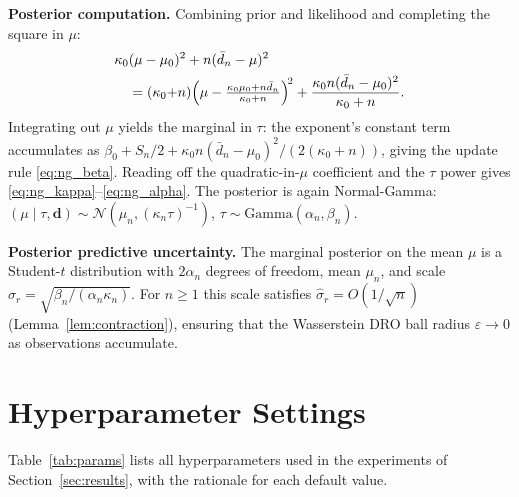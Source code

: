 \documentclass[opre,dblanonrev]{informs4}
\begin{document}
\begin{APPENDICES}
\textbf{Posterior computation.}
Combining prior and likelihood and completing the square in $\mu$:
\begin{align*}
&\kappa_0(\mu-\mu_0)^2 + n(\bar{d}_n - \mu)^2 \\
&\quad= (\kappa_0{+}n)\Bigl(\mu - \tfrac{\kappa_0\mu_0+n\bar{d}_n}{\kappa_0+n}\Bigr)^{\!2}
  + \frac{\kappa_0 n(\bar{d}_n-\mu_0)^2}{\kappa_0+n}.
\end{align*}
Integrating out $\mu$ yields the marginal in $\tau$:
the exponent's constant term accumulates as
$\beta_0 + S_n/2 + \kappa_0 n(\bar{d}_n-\mu_0)^2/(2(\kappa_0+n))$,
giving the update rule \eqref{eq:ng_beta}.
Reading off the quadratic-in-$\mu$ coefficient and the $\tau$ power
gives \eqref{eq:ng_kappa}--\eqref{eq:ng_alpha}.
The posterior is again Normal-Gamma:
$(\mu\mid\tau,\mathbf{d}) \sim \mathcal{N}(\mu_n, (\kappa_n\tau)^{-1})$,
$\tau \sim \mathrm{Gamma}(\alpha_n,\beta_n)$.

\textbf{Posterior predictive uncertainty.}
The marginal posterior on the mean $\mu$ is a Student-$t$ distribution with
$2\alpha_n$ degrees of freedom, mean $\mu_n$, and scale
$\hat\sigma_r = \sqrt{\beta_n/(\alpha_n\kappa_n)}$.
For $n \geq 1$ this scale satisfies $\hat\sigma_r = O(1/\sqrt{n})$
(Lemma~\ref{lem:contraction}), ensuring that the Wasserstein DRO ball
radius $\varepsilon \to 0$ as observations accumulate.

\section{Hyperparameter Settings}
\label{app:params}

Table~\ref{tab:params} lists all hyperparameters used in the experiments
of Section~\ref{sec:results}, with the rationale for each default value.


\end{APPENDICES}
\end{document}
